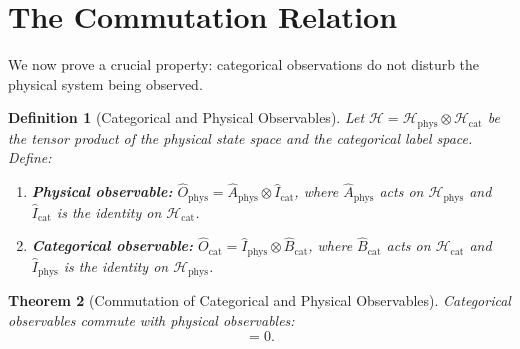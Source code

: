 \documentclass[11pt,twocolumn,a4paper]{article}
\newtheorem{theorem}{Theorem}[section]
\newtheorem{definition}[theorem]{Definition}
\newcommand{\Ocat}{\hat{O}_{\mathrm{cat}}}
\newcommand{\Ophys}{\hat{O}_{\mathrm{phys}}}
\newcommand{\Hilb}{\mathcal{H}}
\begin{document}


\section{The Commutation Relation}
\label{sec:commutation}

We now prove a crucial property: categorical observations do not
disturb the physical system being observed.

\begin{definition}[Categorical and Physical Observables]
\label{def:observables}
Let $\Hilb = \Hilb_{\mathrm{phys}} \otimes \Hilb_{\mathrm{cat}}$
be the tensor product of the physical state space and the categorical
label space. Define:
\begin{enumerate}[label=(\roman*),leftmargin=*]
\item \textbf{Physical observable:}
  $\Ophys = \hat{A}_{\mathrm{phys}} \otimes \hat{I}_{\mathrm{cat}}$,
  where $\hat{A}_{\mathrm{phys}}$ acts on $\Hilb_{\mathrm{phys}}$
  and $\hat{I}_{\mathrm{cat}}$ is the identity on $\Hilb_{\mathrm{cat}}$.
\item \textbf{Categorical observable:}
  $\Ocat = \hat{I}_{\mathrm{phys}} \otimes \hat{B}_{\mathrm{cat}}$,
  where $\hat{B}_{\mathrm{cat}}$ acts on $\Hilb_{\mathrm{cat}}$
  and $\hat{I}_{\mathrm{phys}}$ is the identity on $\Hilb_{\mathrm{phys}}$.
\end{enumerate}
\end{definition}

\begin{theorem}[Commutation of Categorical and Physical Observables]
\label{thm:commutation}
Categorical observables commute with physical observables:
\begin{equation}
[\Ocat, \Ophys] = 0.
\label{eq:commutation}
\end{equation}
\end{theorem}
\end{document}
